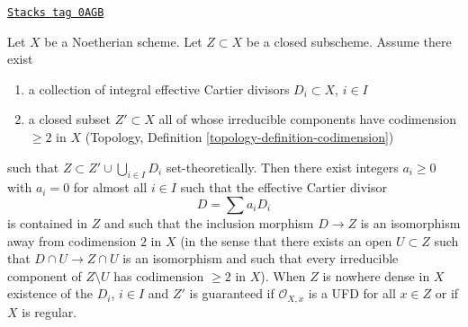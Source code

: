 \begin{lemma}
\label{divisors-lemma-codim-1-part}
\href{https://stacks.math.columbia.edu/tag/0AGB}{\texttt{Stacks tag 0AGB}}

Let $X$ be a Noetherian scheme. Let $Z \subset X$ be a closed subscheme.
Assume there exist
\begin{enumerate}
\item a collection of integral effective Cartier divisors
$D_i \subset X$, $i \in I$
\item a closed subset $Z' \subset X$ all of whose irreducible components
have codimension $\geq 2$ in $X$
(Topology, Definition \ref{topology-definition-codimension})
\end{enumerate}
such that $Z \subset Z' \cup \bigcup_{i \in I} D_i$ set-theoretically.
Then there exist integers $a_i \geq 0$ with $a_i = 0$ for almost all $i \in I$
such that the effective Cartier divisor
$$
D = \sum a_i D_i
$$
is contained in $Z$ and such that the inclusion morphism $D \to Z$
is an isomorphism away from codimension $2$ in $X$
(in the sense that there exists an open $U \subset Z$ such that
$D \cap U \to Z \cap U$ is an isomorphism and such that every
irreducible component of $Z \setminus U$ has codimension $\geq 2$ in $X$).
When $Z$ is nowhere dense in $X$ existence of the $D_i$, $i \in I$ and $Z'$
is guaranteed if $\mathcal{O}_{X, x}$ is a UFD for all $x \in Z$
or if $X$ is regular.
\end{lemma}


